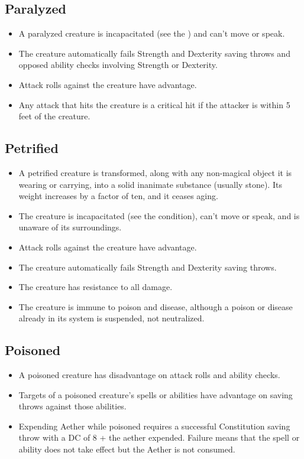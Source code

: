 \subsection{Paralyzed\label{condition:paralyzed}}
\begin{itemize}
\item A paralyzed creature is incapacitated (see the ) and can't move or speak.
\item The creature automatically fails Strength and Dexterity saving throws and opposed ability checks involving Strength or Dexterity.
\item Attack rolls against the creature have advantage.
\item Any attack that hits the creature is a critical hit if the attacker is within 5 feet of the creature.
\end{itemize}

\subsection{Petrified\label{condition:petrified}}
\begin{itemize}
\item A petrified creature is transformed, along with any non-magical object it is wearing or carrying, into a solid inanimate substance (usually stone). Its weight increases by a factor of ten, and it ceases aging.
\item The creature is incapacitated (see the condition), can't move or speak, and is unaware of its surroundings.
\item Attack rolls against the creature have advantage.
\item The creature automatically fails Strength and Dexterity saving throws.
\item The creature has resistance to all damage.
\item The creature is immune to poison and disease, although a poison or disease already in its system is suspended, not neutralized.
\end{itemize}

\subsection{Poisoned\label{condition:poisoned}}
\begin{itemize}
\item A poisoned creature has disadvantage on attack rolls and ability checks.
\item Targets of a poisoned creature's spells or abilities have advantage on saving throws against those abilities.
\item Expending Aether while poisoned requires a successful Constitution saving throw with a DC of 8 + the aether expended. Failure means that the spell or ability does not take effect but the Aether is not consumed. 
\end{itemize}

